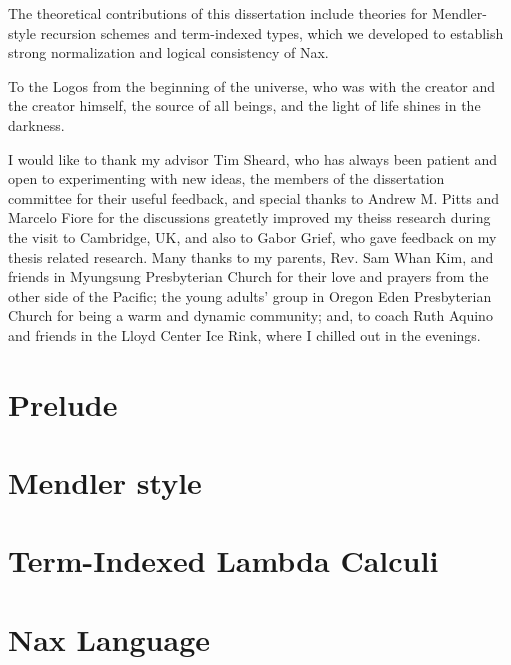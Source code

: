 \documentclass[12pt]{report}
\theoremstyle{definition}
\theoremstyle{remark}
\numberwithin{definition}{section}
\numberwithin{equation}{section}
\numberwithin{proposition}{section}
\numberwithin{conjecture}{section}
\numberwithin{theorem}{section}
\numberwithin{lemma}{section}
\numberwithin{corollary}{section}
\numberwithin{example}{section}
\numberwithin{remark}{section}
\begin{document}
The theoretical contributions of this dissertation include theories for
Mendler-style recursion schemes and term-indexed types, which we
developed to establish strong normalization and logical consistency of Nax.

To the Logos from the beginning of the universe, who was with the creator
and the creator himself, the source of all beings, and the light of life
shines in the darkness.

I would like to thank my advisor Tim Sheard, who has always been patient and
open to experimenting with new ideas, the members of the dissertation committee
for their useful feedback, and special thanks to Andrew M. Pitts and
Marcelo Fiore for the discussions greatetly improved my theiss research
during the visit to Cambridge, UK, and also to Gabor Grief, who gave feedback on
my thesis related research. Many thanks to my parents,
Rev. Sam Whan Kim, and friends in Myungsung Presbyterian Church for their
love and prayers from the other side of the Pacific; the young adults' group
in Oregon Eden Presbyterian Church for being a warm and dynamic community; and,
to coach Ruth Aquino and friends in the Lloyd Center Ice Rink, where I chilled
out in the evenings.
\newpage

\afterpreface
\body


\part{Prelude}\label{part:Prelude}

\part{Mendler style}\label{part:Mendler}

\part{Term-Indexed Lambda Calculi}\label{part:Calculi}

\part{Nax Language}\label{part:Nax}
\end{document}
